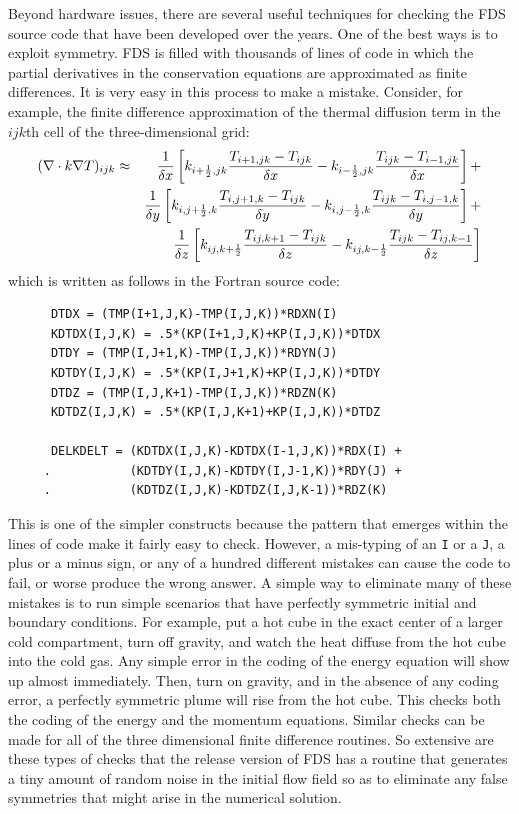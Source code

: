 \documentclass[11pt]{book}
\newcommand{\ct}{\tt\small}
\begin{document}
Beyond hardware issues, there are several useful techniques for checking the FDS source code that have been developed over the years. One of the
best ways is to exploit symmetry. FDS is filled with thousands of lines of code in which the partial derivatives in the conservation equations are
approximated as finite differences. It is very easy in this process to make a mistake. Consider, for example, the finite difference approximation of
the thermal diffusion term in the $ijk$th cell of the three-dimensional grid:
\begin{eqnarray*}
(\nabla \cdot k \nabla T)_{ijk} &\approx&
              \frac{1}{\delta x}
         \left[k_{i+\frac{1}{2},jk}\frac{T_{i+1,jk}-T_{ijk}}{\delta x}
              -k_{i-\frac{1}{2},jk}\frac{T_{ijk}-T_{i-1,jk}}{\delta x}\right]+  \nonumber \\
            &&\frac{1}{\delta y}
         \left[k_{i,j+\frac{1}{2},k}\frac{T_{i,j+1,k}-T_{ijk}}{\delta y}
              -k_{i,j-\frac{1}{2},k}\frac{T_{ijk}-T_{i,j-1,k}}{\delta y}\right]+ \nonumber \\
            &&\frac{1}{\delta z}
         \left[k_{ij,k+\frac{1}{2}}\frac{T_{ij,k+1}-T_{ijk}}{\delta z}
              -k_{ij,k-\frac{1}{2}}\frac{T_{ijk}-T_{ij,k-1}}{\delta z}\right]
\end{eqnarray*}
which is written as follows in the Fortran source code:
\begin{verbatim}
      DTDX = (TMP(I+1,J,K)-TMP(I,J,K))*RDXN(I)
      KDTDX(I,J,K) = .5*(KP(I+1,J,K)+KP(I,J,K))*DTDX
      DTDY = (TMP(I,J+1,K)-TMP(I,J,K))*RDYN(J)
      KDTDY(I,J,K) = .5*(KP(I,J+1,K)+KP(I,J,K))*DTDY
      DTDZ = (TMP(I,J,K+1)-TMP(I,J,K))*RDZN(K)
      KDTDZ(I,J,K) = .5*(KP(I,J,K+1)+KP(I,J,K))*DTDZ

      DELKDELT = (KDTDX(I,J,K)-KDTDX(I-1,J,K))*RDX(I) +
     .           (KDTDY(I,J,K)-KDTDY(I,J-1,K))*RDY(J) +
     .           (KDTDZ(I,J,K)-KDTDZ(I,J,K-1))*RDZ(K)
\end{verbatim}
This is one of the simpler constructs because the pattern that emerges within the lines of code make it fairly easy to check. However, a mis-typing
of an {\ct I} or a {\ct J}, a plus or a minus sign, or any of a hundred different mistakes can cause the code to fail, or worse produce the wrong
answer. A simple way to eliminate many of these mistakes is to run simple scenarios that have perfectly symmetric initial and boundary conditions.
For example, put a hot cube in the exact center of a larger cold compartment, turn off gravity, and watch the heat diffuse from the hot cube into the
cold gas. Any simple error in the coding of the energy equation will show up almost immediately. Then, turn on gravity, and in the absence of any
coding error, a perfectly symmetric plume will rise from the hot cube. This checks both the coding of the energy and the momentum equations. Similar
checks can be made for all of the three dimensional finite difference routines. So extensive are these types of checks that the release version of
FDS has a routine that generates a tiny amount of random noise in the initial flow field so as to eliminate any false symmetries that might arise in
the numerical solution.
\end{document}
